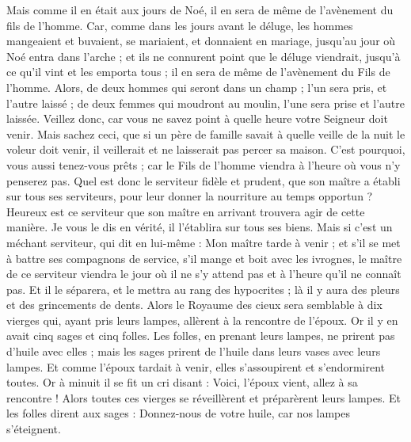 \begin{multicols}{2}
Mais comme il en était aux jours de Noé, il en sera de même de l'avènement du fils de l'homme.
Car, comme dans les jours avant le déluge, les hommes mangeaient et buvaient, se mariaient, et donnaient en mariage, jusqu'au jour où Noé entra dans l'arche ;
et ils ne connurent point que le déluge viendrait, jusqu'à ce qu'il vint et les emporta tous ; il en sera de même de l'avènement du Fils de l'homme.
Alors, de deux hommes qui seront dans un champ ; l'un sera pris, et l'autre laissé ;
de deux femmes qui moudront au moulin, l'une sera prise et l'autre laissée.
Veillez donc, car vous ne savez point à quelle heure votre Seigneur doit venir.
Mais sachez ceci, que si un père de famille savait à quelle veille de la nuit le voleur doit venir, il veillerait et ne laisserait pas percer sa maison.
C'est pourquoi, vous aussi tenez-vous prêts ; car le Fils de l'homme viendra à l'heure où vous n'y penserez pas.
Quel est donc le serviteur fidèle et prudent, que son maître a établi sur tous ses serviteurs, pour leur donner la nourriture au temps opportun ?
Heureux est ce serviteur que son maître en arrivant trouvera agir de cette manière.
Je vous le dis en vérité, il l'établira sur tous ses biens.
Mais si c'est un méchant serviteur, qui dit en lui-même : Mon maître tarde à venir ;
et s'il se met à battre ses compagnons de service, s'il mange et boit avec les ivrognes,
le maître de ce serviteur viendra le jour où il ne s'y attend pas et à l'heure qu'il ne connaît pas.
Et il le séparera, et le mettra au rang des hypocrites ; là il y aura des pleurs et des grincements de dents.
\VerseOne{}Alors le Royaume des cieux sera semblable à dix vierges qui, ayant pris leurs lampes, allèrent à la rencontre de l'époux.
Or il y en avait cinq sages et cinq folles.
Les folles, en prenant leurs lampes, ne prirent pas d'huile avec elles ;
mais les sages prirent de l'huile dans leurs vases avec leurs lampes.
Et comme l'époux tardait à venir, elles s'assoupirent et s'endormirent toutes.
Or à minuit il se fit un cri disant : Voici, l'époux vient, allez à sa rencontre !
Alors toutes ces vierges se réveillèrent et préparèrent leurs lampes.
Et les folles dirent aux sages : Donnez-nous de votre huile, car nos lampes s'éteignent.

\end{multicols}
